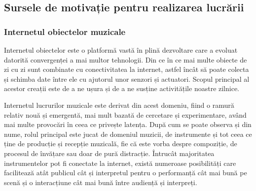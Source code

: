 \documentclass[../IoMusT.tex]{subfiles}
\begin{document}
\subsection{Sursele de motivație pentru realizarea lucrării}
\subsubsection{Internetul obiectelor muzicale}
Internetul obiectelor este o platformă vastă  în plină dezvoltare care a evoluat datorită convergenței a mai multor tehnologii. Din ce în ce mai multe obiecte de zi cu zi sunt combinate cu conectivitatea la internet, astfel încât să poate colecta și schimba date între ele cu ajutorul unor senzori și actuatori. Scopul principal al acestor creații este de a ne ușura și de a ne susține activitățile noastre zilnice.
\\
\par Internetul lucrurilor muzicale este derivat din acest domeniu, fiind o ramură relativ nouă și emergentă, mai mult bazată de cercetare și experimentare, având mai multe provocări în ceea ce privește latența. După cum se poate observa și din nume, rolul principal este jucat de domeniul muzicii, de instrumente și tot ceea ce ține de producție și recepție muzicală, fie că este vorba despre compoziție, de procesul de învățare sau doar de pură dis\-trac\-ți\-e. Întrucât majoritatea instrumentelor pot fi conectate la internet, există numeroase posibilități care facilitează atât publicul cât și interpretul pentru o performanță cât mai bună pe scenă și o interacțiune cât mai bună între audiență și interpreți.\cite{IoMusT}
\\
\end{document}
